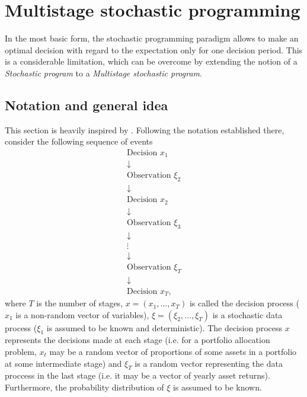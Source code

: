 \section{Multistage stochastic programming}
In the most basic form, the stochastic programming paradigm allows to make an optimal decision with regard to the expectation only for one decision period. This is a considerable limitation, which can be overcome by extending the notion of a \textit{Stochastic program} to a \textit{Multistage stochastic program}. 

\subsection{Notation and general idea}
This section is heavily inspired by \cite[Section 3.3.]{stochasticprogrammingbible}.
Following the notation established there, consider the following sequence of events
\begin{equation*}
\begin{gathered}
\mathrm{Decision} \, \, x_1 
\\
\downarrow
\\
\mathrm{Observation} \,\, \xi_2
\\
\downarrow
\\
\mathrm{Decision} \,\, x_2 
\\
\downarrow
\\
\mathrm{Observation} \,\, \xi_3
\\
\downarrow
\\
\vdots
\\
\downarrow
\\
\mathrm{Observation} \,\, \xi_T
\\
\downarrow
\\
\mathrm{Decision} \,\, x_T,
\end{gathered}
\end{equation*}
where $T$ is the number of stages, $x=(x_1,\dots,x_T)$ is called the decision process ($x_1$ is a non-random vector of variables), $\xi = (\xi_2,\dots,\xi_{T})$ is a stochastic data process ($\xi_1$ is assumed to be known and deterministic). The decision process $x$ represents the decisions made at each stage (i.e. for a portfolio allocation problem, $x_t$ may be a random vector of proportions of some assets in a portfolio at some intermediate stage) and $\xi_{T}$ is a random vector representing the data proccess in the last stage (i.e. it may be a vector of yearly asset returns). Furthermore, the probability distribution of $\xi$ is assumed to be known.
